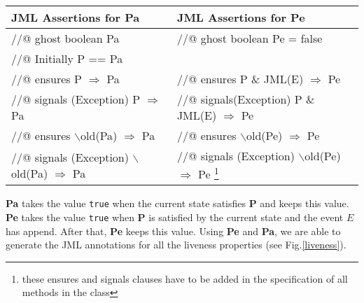 \begin{center}
\vline
\begin{tabular}{l|l}
\hline
 \small{\textbf{JML Assertions for Pa}} & \small{\textbf{JML Assertions for Pe}}\\
\hline
\small //@ ghost boolean Pa &\small //@ ghost boolean Pe = false \\

\small //@ Initially P == Pa & \\
\hline

\hline
\small //@ ensures P $\Rightarrow$  Pa &\small //@ ensures P \& JML(E) $\Rightarrow$ Pe\\


\hline
\small //@ signals (Exception) P $\Rightarrow$  Pa &  \small //@ signals(Exception) P \& JML(E) $\Rightarrow$ Pe\\

\hline

\small //@ ensures $\backslash$old(Pa) $\Rightarrow$ Pa & \small //@ ensures $\backslash$old(Pe) $\Rightarrow$ Pe\\

\hline
\small //@ signals (Exception)  $\backslash$old(Pa) $\Rightarrow$ Pa & \small //@ signals (Exception) $\backslash$old(Pe) $\Rightarrow$ Pe \footnote{these ensures and signals clauses have to be added in the specification of all methods in the class}\\

\hline
\end{tabular}\vline
\end{center}

\textbf{Pa} takes the value \texttt{true} when the current state satisfies \textbf{P}  and keeps this value. \textbf{Pe} takes the value \texttt{true} when \textbf{P} is satisfied by the current state and the event $E$ has append. After that, \textbf{Pe} keeps this value. Using \textbf{Pe} and \textbf{Pa}, we are able to generate the JML annotations  for all the liveness properties (see Fig.\ref{liveness}). 



